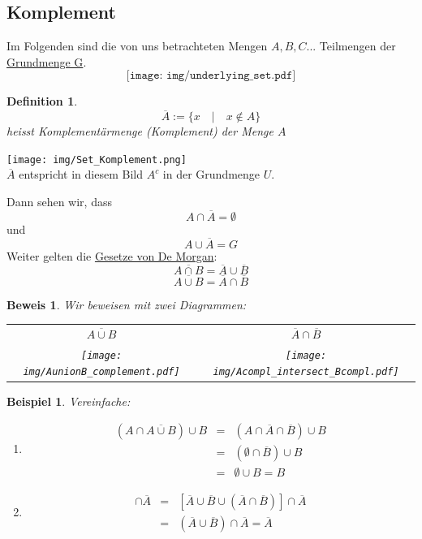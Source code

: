 \documentclass{report}
\newtheorem{mydef}{Definition}
\newtheorem{myexample}{Beispiel}
\newtheorem{myproof}{Beweis}
\begin{document}
\subsection{Komplement}
Im Folgenden sind die von uns betrachteten Mengen $A, B, C$... Teilmengen der \underline{Grundmenge G}.
$$\texttt{[image: img/underlying\_set.pdf]}$$
\begin{mydef}\begin{equation}\overline{A} := \{x \quad | \quad x \not \in A\}\end{equation} heisst Komplementärmenge (Komplement) der Menge $A$\end{mydef}
\begin{center}\texttt{[image: img/Set\_Komplement.png]}\\$\overline{A}$ entspricht in diesem Bild $A^c$ in der Grundmenge $U$.\end{center}
Dann sehen wir, dass
\begin{equation}A \cap \overline{A} = \emptyset\end{equation}
und
\begin{equation}A \cup \overline{A} = G\end{equation}
Weiter gelten die \underline{Gesetze von De Morgan}:
\begin{equation}\overline{A \cap B} = \overline{A} \cup \overline{B}\end{equation}
\begin{equation}\overline{A \cup B} = \overline{A} \cap \overline{B}\end{equation}
\begin{myproof}Wir beweisen mit zwei Diagrammen:
\begin{center}\begin{tabular}{c c}
$\overline{A \cup B}$ & $\overline{A} \cap \overline{B}$\\
\texttt{[image: img/AunionB\_complement.pdf]} & \texttt{[image: img/Acompl\_intersect\_Bcompl.pdf]}
\end{tabular}
\end{center}\end{myproof}
\begin{myexample}Vereinfache:
\begin{enumerate}
\item \begin{eqnarray}(A \cap \overline{A \cup B}) \cup B & = & (A \cap \overline{A} \cap \overline{B}) \cup B\\ \nonumber
& = & (\emptyset \cap \overline{B}) \cup B \\ \nonumber
& = & \emptyset \cup B = B
\end{eqnarray}
\item \begin{eqnarray}[\overline{A \cap B} \cup (\overline{A} \cap \overline{B})] \cap \overline{A} & = & [\overline{A} \cup \overline{B} \cup (\overline{A} \cap \overline{B})] \cap \overline{A} \\ \nonumber
& = & (\overline{A} \cup \overline{B}) \cap \overline{A} = \overline{A}
\end{eqnarray}
\end{enumerate}\end{myexample}
\end{document}
